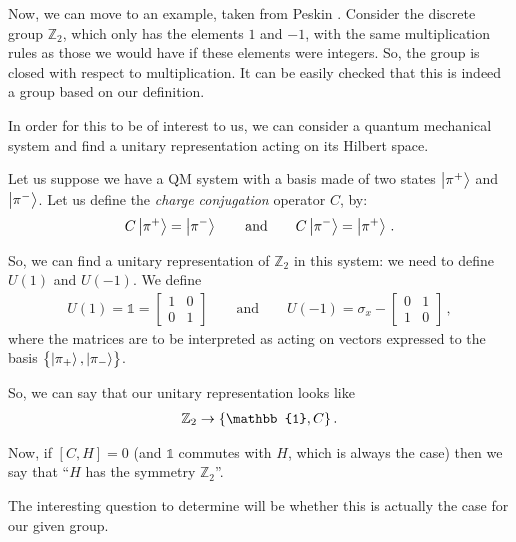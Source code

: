 \documentclass[main.tex]{subfiles}
\begin{document}
Now, we can move to an example, taken from Peskin \cite[]{peskinConceptsElementaryParticle2019}. 
Consider the discrete group \(\mathbb{Z}_{2}\), which only has the elements \(1\) and \(-1\), with the same multiplication rules as those we would have if these elements were integers. 
So, the group is closed with respect to multiplication.
It can be easily checked that this is indeed a group based on our definition. 

In order for this to be of interest to us, we can consider a quantum mechanical system and find a unitary representation acting on its Hilbert space. 

Let us suppose we have a QM system with a basis made of two states \(\ket{\pi^{+}}\) and \(\ket{\pi^{-}}\). Let us define the \emph{charge conjugation} operator \(C\), by: 
%
\begin{align}
C \ket{\pi^{+}} = \ket{\pi^{-}} 
\qquad \text{and} \qquad
C \ket{\pi^{-}} = \ket{\pi^{+}} 
\,.
\end{align}

So, we can find a unitary representation of \(\mathbb{Z}_{2}\) in this system: we need to define \(U(1)\) and \(U(-1)\). We define 
%
\begin{subequations}
\begin{align}
U(1) = \mathbb{1} =\left[\begin{array}{cc}
1 & 0 \\ 
0 & 1
\end{array}\right] 
\qquad \text{and} \qquad
U(-1) = \sigma_{x} - \left[\begin{array}{cc}
0 & 1 \\ 
1 & 0
\end{array}\right]
\,,
\end{align}
\end{subequations}
%
where the matrices are to be interpreted as acting on vectors expressed to the basis \(\qty{\ket{\pi_{+}}, \ket{\pi_{-}}}\).

So, we can say that our unitary representation looks like 
%
\begin{align}
\mathbb{Z}_{2} \rightarrow \qty{\mathbb{1}, C}
\,.
\end{align}

Now, if \([C, H] =0\) (and \(\mathbb{1}\) commutes with \(H\), which is always the case) then we say that ``\(H\) has the symmetry \(\mathbb{Z}_{2}\)''.

The interesting question to determine will be whether this is actually the case for our given group. 
\end{document}
